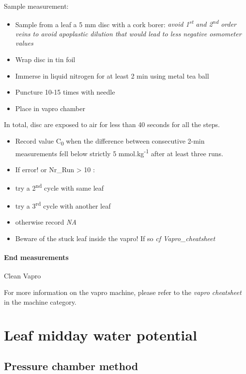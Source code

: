 \documentclass[
  12pt,
  american,
  a4paper,
  extrafontsizes,onecolumn,openright
  ]{memoir}
\providecommand{\tightlist}{%
  \setlength{\itemsep}{0pt}\setlength{\parskip}{0pt}}
\begin{document}
Sample measurement:

\begin{itemize}
\tightlist
\item
  Sample from a leaf a 5 mm disc with a cork borer: \emph{avoid 1\textsuperscript{st} and 2\textsuperscript{nd} order veins to avoid apoplastic dilution that would lead to less negative osmometer values}
\item
  Wrap disc in tin foil
\item
  Immerse in liquid nitrogen for at least 2 min using metal tea ball
\item
  Puncture 10-15 times with needle
\item
  Place in vapro chamber
\end{itemize}

In total, disc are exposed to air for less than 40 seconds for all the steps.

\begin{itemize}
\item
  Record value C\textsubscript{0} when the difference between consecutive 2-min measurements fell below strictly 5 mmol.kg\textsuperscript{-1} after at least three runs.
\item
  If error! or Nr\_Run \textgreater{} 10 :
\item
  try a 2\textsuperscript{nd} cycle with same leaf
\item
  try a 3\textsuperscript{rd} cycle with another leaf
\item
  otherwise record \emph{NA}
\item
  Beware of the stuck leaf inside the vapro! If so \emph{cf Vapro\_cheatsheet}
\end{itemize}

\hypertarget{end-measurements}{%
\paragraph{End measurements}\label{end-measurements}}

Clean Vapro

For more information on the vapro machine, please refer to the \emph{vapro cheatsheet} in the machine category.

\hypertarget{leaf-midday-water-potential}{%
\section{Leaf midday water potential}\label{leaf-midday-water-potential}}

\hypertarget{pressure-chamber-method}{%
\subsection{Pressure chamber method}\label{pressure-chamber-method}}
\end{document}
